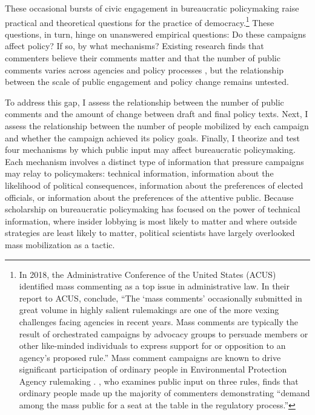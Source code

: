 These occasional bursts of civic engagement in bureaucratic policymaking raise practical and theoretical questions for the practice of democracy.\footnote{In 2018, the Administrative Conference of the United States (ACUS) identified mass commenting as a top issue in administrative law. In their report to ACUS, \citet{SantAmbrogio2018} conclude, ``The `mass comments' occasionally submitted in great volume in highly salient rulemakings are one of the more vexing challenges facing agencies in recent years. Mass comments are typically the result of orchestrated campaigns by advocacy groups to persuade members or other like-minded individuals to express support for or opposition to an agency's proposed rule.'' 
Mass comment campaigns are known to drive significant participation of ordinary people in Environmental Protection Agency rulemaking \citep{Judge-Lord2019, Potter2017, Balla2018}. \citet{Cuellar2005}, who examines public input on three rules, finds that ordinary people made up the majority of commenters demonstrating ``demand among the mass public for a seat at the table in the regulatory process.'' } 
These questions, in turn, hinge on unanswered empirical questions: Do these campaigns affect policy? If so, by what mechanisms? Existing research finds that commenters believe their comments matter \citep{Yackee2015JPART} and that the number of public comments varies across agencies and policy processes \citep{Judge-Lord2019, Libgober2018, Moore2017},
but the relationship between the scale of public engagement and policy change remains untested. 

To address this gap, I assess the relationship between the number of public comments and the amount of change between draft and final policy texts. Next, I assess the relationship between the number of people mobilized by each campaign and whether the campaign achieved its policy goals. Finally, I theorize and test four mechanisms by which public input may affect bureaucratic policymaking. Each mechanism involves a distinct type of information that pressure campaigns may relay to policymakers: technical information, information about the likelihood of political consequences, information about the preferences of elected officials, or information about the preferences of the attentive public. Because scholarship on bureaucratic policymaking has focused on the power of technical information, where insider lobbying is most likely to matter and where outside strategies are least likely to matter, political scientists have largely overlooked mass mobilization as a tactic.

